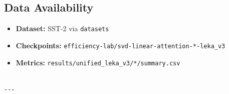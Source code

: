 \subsection{Data Availability}

\begin{itemize}
\item \textbf{Dataset:} SST-2 via \texttt{datasets}
\item \textbf{Checkpoints:} \texttt{efficiency-lab/svd-linear-attention-*-leka\_v3}
\item \textbf{Metrics:} \texttt{results/unified\_leka\_v3/*/summary.csv}
\end{itemize}
\begin{lstlisting}

---
\end{lstlisting}